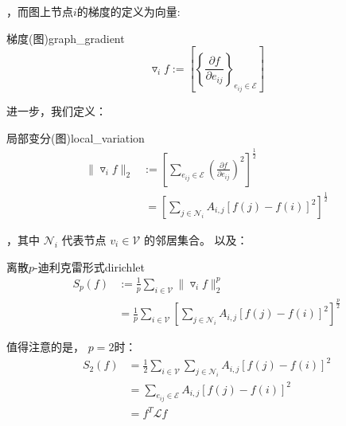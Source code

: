 \documentclass[color=gray,base=hide,cn]{elegantbook}
\begin{document}
，而图上节点$i$的梯度的定义为向量:

\begin{definition}{梯度(图)}{graph_gradient}
    \begin{equation}
        \triangledown_i f := \left[\left\{\frac{\partial f }{\partial e_{ij} } \right\}_{e_{ij} \in \mathcal{E}}\right]
    \end{equation}
\end{definition}

进一步，我们定义：
\begin{definition}{局部变分(图)}{local_variation}
    \begin{equation}
        \begin{aligned}
            \| \triangledown_i f \|_2 & :=\left[\sum_{e_{ij} \in \mathcal{E}} \left(\frac{\partial f }{\partial e_{ij} }\right)^2\right]^{\frac{1}{2}} \\
                                      & ~=\left[\sum_{j \in \mathcal{N}_i}A_{i,j}\left[f(j)-f(i)\right]^2\right]^{\frac{1}{2}}
        \end{aligned}
    \end{equation}
\end{definition}
，其中 $\mathcal{N}_i$ 代表节点 $v_i \in \mathcal{V}$ 的邻居集合。
以及：
\begin{definition}{离散$p$-迪利克雷形式}{dirichlet}
    \begin{equation}
        \begin{aligned}
            S_p(f) & :=\frac{1}{p}\sum_{i \in \mathcal{V}}\| \triangledown_i f \|_2^p                                                         \\
                   & =\frac{1}{p}\sum_{i \in \mathcal{V}}\left[\sum_{j \in \mathcal{N}_i}A_{i,j}\left[f(j)-f(i)\right]^2\right]^{\frac{p}{2}}
        \end{aligned}
    \end{equation}
\end{definition}

值得注意的是， $p=2$时：
\begin{equation}
    \begin{aligned}
        S_2(f) & = \frac{1}{2}\sum_{i \in \mathcal{V}}\sum_{j \in \mathcal{N}_i}A_{i,j}\left[f(j)-f(i)\right]^2 \\
               & = \sum_{e_{ij} \in \mathcal{E}}A_{i,j}\left[f(j)-f(i)\right]^2                                 \\
               & =f^T\mathcal{L} f
    \end{aligned}
\end{equation}
\end{document}
